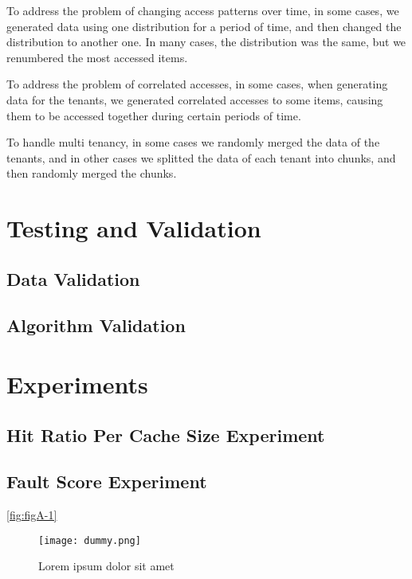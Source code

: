 To address the problem of changing access patterns over time, in some cases, we generated data 
using one distribution for a period of time, and then changed the distribution to another one. 
In many cases, the distribution was the same, but we renumbered the most accessed items.

To address the problem of correlated accesses, in some cases, when generating data for the 
tenants, we generated correlated accesses to some items, causing them to be accessed together 
during certain periods of time.

To handle multi tenancy, in some cases we randomly merged the data of the tenants, and in 
other cases we splitted the data of each tenant into chunks, and then randomly merged the
chunks.

\section{Testing and Validation}

\subsection{Data Validation}

\subsection{Algorithm Validation}

\section{Experiments}

\subsection{Hit Ratio Per Cache Size Experiment}

\subsection{Fault Score Experiment}

\lipsum[1-3]

\lipsum[1-1] \ref{fig:figA-1}

\begin{figure}[H]
    \centering
    \texttt{[image: dummy.png]}
    \caption{Lorem ipsum dolor sit amet}
    \label{fig:figA-3}
\end{figure}

